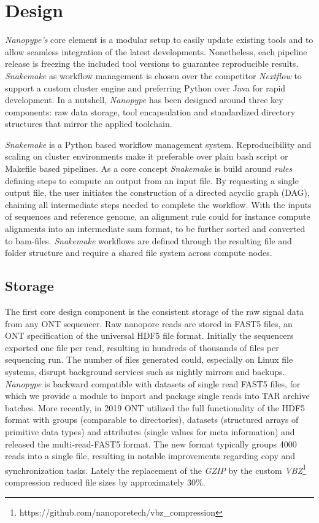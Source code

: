 \section{Design}
\label{sec:nanopype:design}
\textit{Nanopype’s} core element is a modular setup to easily update existing tools and to allow seamless integration of the latest developments. Nonetheless, each pipeline release is freezing the included tool versions to guarantee reproducible results. \textit{Snakemake} as workflow management is chosen over the competitor \textit{Nextflow} to support a custom cluster engine and preferring Python over Java for rapid development. In a nutshell, \textit{Nanopype} has been designed around three key components: raw data storage, tool encapsulation and standardized directory structures that mirror the applied toolchain.

\begin{tcolorbox}[breakable,title=Snakemake]
	\textit{Snakemake} is a Python based workflow management system. Reproducibility and scaling on cluster environments make it preferable over plain bash script or Makefile based pipelines. As a core concept \textit{Snakemake} is build around \textit{rules} defining steps to compute an output from an input file. By requesting a single output file, the user initiates the construction of a directed acyclic graph (DAG), chaining all intermediate steps needed to complete the workflow. With the inputs of sequences and reference genome, an alignment rule could for instance compute alignments into an intermediate sam format, to be further sorted and converted to bam-files. \textit{Snakemake} workflows are defined through the resulting file and folder structure and require a shared file system across compute nodes.
\end{tcolorbox}


\subsection{Storage}
\label{subsec:nanopype:storage}
The first core design component is the consistent storage of the raw signal data from any ONT sequencer. 
Raw nanopore reads are stored in FAST5 files, an ONT specification of the universal HDF5 file format. Initially the sequencers exported one file per read, resulting in hundreds of thousands of files per sequencing run. 
The number of files generated could, especially on Linux file systems, disrupt background services such as nightly mirrors and backups.
\textit{Nanopype} is backward compatible with datasets of single read FAST5 files, for which we provide a module to import and package single reads into TAR archive batches. More recently, in 2019 ONT utilized the full functionality of the HDF5 format with groups (comparable to directories), datasets (structured arrays of primitive data types) and attributes (single values for meta information) and released the multi-read-FAST5 format. The new format typically groups 4000 reads into a single file, resulting in notable improvements regarding copy and synchronization tasks. Lately the replacement of the \textit{GZIP} by the custom \textit{VBZ}\footnote{https://github.com/nanoporetech/vbz\_compression} compression reduced file sizes by approximately 30\%.

